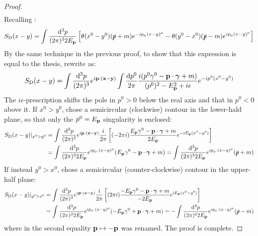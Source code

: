\begin{proofbox}
\begin{proof}
\begin{equation*}
\begin{split}
      \end{split}
    \end{equation*}
    Recalling :
    \begin{equation*}
      S_\text{D}(x - y) = \int \frac{\mathrm{d}^3p}{(2\pi)^3 2E_{\mathbf{p}}} \left[ \theta(x^0 - y^0) (\slashed{p} + m) e^{-i p_\mu (x-y)^\mu} - \theta(y^0 - x^0) (\slashed{p} - m) e^{i p_\mu (x-y)^\mu} \right]
    \end{equation*}
    By the same technique in the previous proof, to show that this expression is equal to the thesis, rewrite  as:
    \begin{equation*}
      S_\text{D}(x - y) = \int \frac{\mathrm{d}^3p}{(2\pi)^3} e^{i \mathbf{p} \cdot (\mathbf{x} - \mathbf{y})} \int \frac{\mathrm{d} p^0}{2\pi} \frac{i (p^0 \gamma^0 - \mathbf{p} \cdot \boldsymbol{\gamma} + m)}{(p^0)^2 - E_{\mathbf{p}}^2 + i\epsilon} e^{-i p^0 (x^0 - y^0)}
    \end{equation*}
    The $ i\epsilon $-prescription shifts the pole in $ p^0 > 0 $ below the real axis and that in $ p^0 < 0 $ above it. If $ x^0 > y^0 $, chose a semicircular (clockwise) contour in the lower-hald plane, so that only the $ p^0 = E_{\mathbf{p}} $ singularity is enclosed:
    \begin{equation*}
      \begin{split}
        S_\text{D}(x - y)\vert_{x^0 > y^0}
        & = \int \frac{\mathrm{d}^3p}{(2\pi)^3} e^{i \mathbf{p} \cdot (\mathbf{x} - \mathbf{y})} \frac{i}{2\pi} \left[ (-2\pi i) \frac{E_{\mathbf{p}} \gamma^0 - \mathbf{p} \cdot \boldsymbol{\gamma} + m}{2E_{\mathbf{p}}} e^{-i E_{\mathbf{p}} (x^0 - y^0)} \right] \\
        & = \int \frac{\mathrm{d}^3p}{(2\pi)^3 2E_{\mathbf{p}}} e^{i p_\mu \cdot (x-y)^\mu} (E_{\mathbf{p}} \gamma^0 - \mathbf{p} \cdot \boldsymbol{\gamma} + m) = \int \frac{\mathrm{d}^3p}{(2\pi)^3 2E_{\mathbf{p}}} e^{i p_\mu \cdot (x-y)^\mu} (\slashed{p} + m)
      \end{split}
    \end{equation*}
    If instead $ y^0 > x^0 $, chose a semicircular (counter-clockwise) contour in the upper-half plane:
    \begin{equation*}
      \begin{split}
        S_\text{D}(x - y)\vert_{y^0 > x^0}
        & = \int \frac{\mathrm{d}^3p}{(2\pi)^3} e^{i \mathbf{p} \cdot (\mathbf{x} - \mathbf{y})} \frac{i}{2\pi} \left[ (2\pi i) \frac{-E_{\mathbf{p}} \gamma^0 - \mathbf{p} \cdot \boldsymbol{\gamma} + m}{-2E_{\mathbf{p}}} e^{i E_{\mathbf{p}} (x^0 - y^0)} \right] \\
        & = \int \frac{\mathrm{d}^3p}{(2\pi)^3 2E_{\mathbf{p}}} e^{i p_\mu \cdot (x-y)^\mu} (-E_{\mathbf{p}} \gamma^0 + \mathbf{p} \cdot \boldsymbol{\gamma} + m) = - \int \frac{\mathrm{d}^3p}{(2\pi)^3 2E_{\mathbf{p}}} e^{i p_\mu \cdot (x-y)^\mu} (\slashed{p} - m)
      \end{split}
    \end{equation*}
    where in the second equality $ \mathbf{p} \mapsto -\mathbf{p} $ was renamed. The proof is complete.
  \end{proof}
\end{proofbox}

